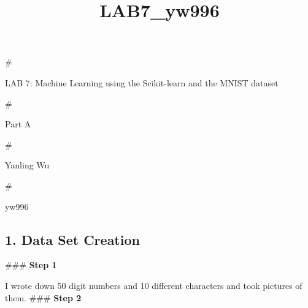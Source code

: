 \documentclass[11pt]{article}
\title{LAB7\_yw996}
\begin{document}
    
    
    \maketitle
    
    

    
    \#

LAB 7: Machine Learning using the Scikit-learn and the MNIST dataset

\#

Part A

\#

Yanling Wu

\#

yw996

\subsection{1. Data Set Creation}\label{data-set-creation}

\#\#\# \textbf{Step 1}

I wrote down 50 digit numbers and 10 different characters and took
pictures of them. \#\#\# \textbf{Step 2}
\end{document}
